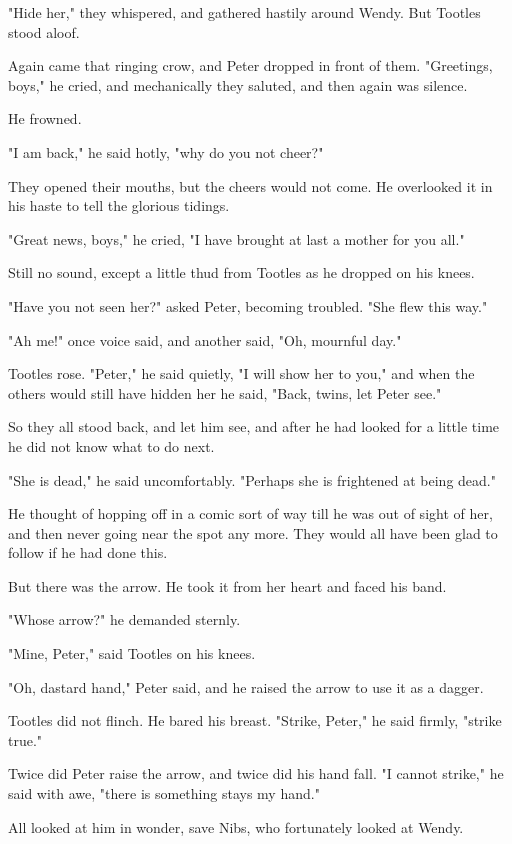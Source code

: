 "Hide her," they whispered, and gathered hastily around Wendy.
But Tootles stood aloof.

Again came that ringing crow, and Peter dropped in front of them.
"Greetings, boys," he cried, and mechanically they saluted, and then again was silence.

He frowned.

"I am back," he said hotly, "why do you not cheer?"

They opened their mouths, but the cheers would not come.
He overlooked it in his haste to tell the glorious tidings.

"Great news, boys," he cried, "I have brought at last a mother for you all."

Still no sound, except a little thud from Tootles as he dropped on his knees.

"Have you not seen her?\@" asked Peter, becoming troubled.
"She flew this way."

"Ah me!\@" once voice said, and another said, "Oh, mournful day."

Tootles rose.
"Peter," he said quietly, "I will show her to you," and when the others would still have hidden her he said, "Back, twins, let Peter see."

So they all stood back, and let him see, and after he had looked for a little time he did not know what to do next.

"She is dead," he said uncomfortably.
"Perhaps she is frightened at being dead."

He thought of hopping off in a comic sort of way till he was out of sight of her, and then never going near the spot any more.
They would all have been glad to follow if he had done this.

But there was the arrow.
He took it from her heart and faced his band.

"Whose arrow?\@" he demanded sternly.

"Mine, Peter," said Tootles on his knees.

"Oh, dastard hand," Peter said, and he raised the arrow to use it as a dagger.

Tootles did not flinch.
He bared his breast.
"Strike, Peter," he said firmly, "strike true."

Twice did Peter raise the arrow, and twice did his hand fall.
"I cannot strike," he said with awe, "there is something stays my hand."

All looked at him in wonder, save Nibs, who fortunately looked at Wendy.

